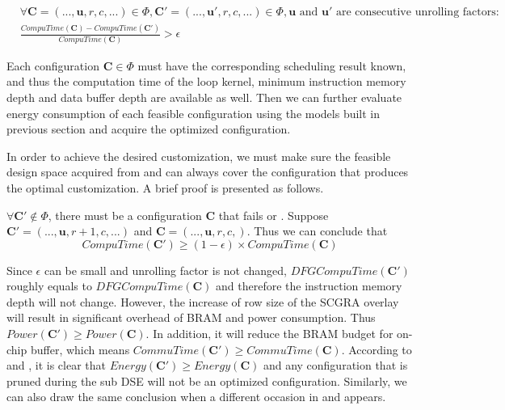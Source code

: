 \begin{equation} \label{eq:cond2}
    \begin{split}
        &\forall \bm{C}=(...,\bm{u},r,c,...) \in \Phi, \bm{C'}=(...,\bm{u'},r,c,...) \in \Phi, \bm{u} \text{ and } \bm{u'} \text{ are consecutive unrolling factors}: \\
        &\frac{CompuTime(\bm{C})-CompuTime(\bm{C'})}{CompuTime(\bm{C})} > \epsilon
    \end{split}
\end{equation}

Each configuration $\bm{C} \in \Phi$ must have the corresponding 
scheduling result known, and thus the computation time of the 
loop kernel, minimum instruction memory depth and data buffer 
depth are available as well. Then we can further evaluate 
energy consumption of each feasible configuration using the models built in 
previous section and acquire the optimized configuration.

In order to achieve the desired customization, we must make sure the 
feasible design space acquired from  and  can always 
cover the configuration that produces the optimal customization. A brief 
proof is presented as follows.

$\forall \bm{C'} \notin \Phi$, there must be a configuration $\bm{C}$ that fails 
 or . Suppose $\bm{C'}=(...,\bm{u},r+1,c,...)$ 
and $\bm{C}=(...,\bm{u},r,c,)$. Thus we can conclude that 
\begin{equation}
    CompuTime(\bm{C'}) \geq (1-\epsilon) \times CompuTime(\bm{C})
\end{equation}

Since $\epsilon$ can be small and unrolling factor is not changed, $DFGCompuTime(\bm{C'})$ 
roughly equals to $DFGCompuTime(\bm{C})$ and therefore the instruction memory depth 
will not change. However, the increase of row size of the SCGRA overlay will result in 
significant overhead of BRAM and power consumption. Thus $Power(\bm{C'}) 
\geq Power(\bm{C})$. In addition, it will reduce the BRAM budget 
for on-chip buffer, which means $CommuTime(\bm{C'}) \geq CommuTime(\bm{C})$. 
According to  and , it is clear 
that $Energy(\bm{C'}) \geq Energy(\bm{C})$ and 
any configuration that is pruned during the sub DSE will not be an optimized 
configuration. Similarly, we can also draw the same conclusion when a different 
occasion in  and  appears.

